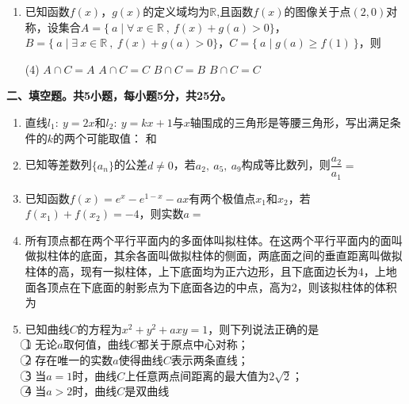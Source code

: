 \documentclass[11pt,a4paper]{ctexart}
\newcommand{\sectiontitle}[1]{
  \par\noindent\textbf{#1}\par%
  }
\begin{document}
\begin{enumerate}
    \item 已知函数$f(x)$，$g(x)$的定义域均为$\mathbb{R}$,且函数$f(x)$的图像关于点$(2,0)$对称，设集合$A=\{\ a \mid \forall \ x\in \mathbb{R} \ ,\ f(x)+g(a)>0\}$，$B=\{\ a \mid \exists \ x\in \mathbb{R} \ ,\ f(x)+g(a)>0\}$，$C=\{\ a \mid g(a) \ge f(1)\ \}$，则
    \begin{tasks}(4)
        \task $A \cap C=A$ 
        \task $A \cap C=C$
        \task $B \cap C=B$
        \task $B \cap C=C$
    \end{tasks}
\end{enumerate}

\newpage
\sectiontitle{二、填空题。共5小题，每小题5分，共25分。}
\begin{enumerate}[start=11] %

    \item 直线$l_1:\ y=2x$和$l_2:\ y=kx+1$与$x$轴围成的三角形是等腰三角形，写出满足条件的$k$的两个可能取值：
    \underline{\hspace{2cm}}和\underline{\hspace{2cm}}

    \item 已知等差数列$\{a_n\}$的公差$d \neq 0$，若$a_2,\ a_5,\ a_9$构成等比数列，则$\dfrac{a_2}{a_1}=$ 
    \underline{\hspace{2cm}}

    \item 已知函数$f(x)=e^x-e^{1-x}-ax$有两个极值点$x_1$和$x_2$，若$f(x_1)+f(x_2)=-4$，则实数$a=$
    \underline{\hspace{2cm}}

    \item 所有顶点都在两个平行平面内的多面体叫拟柱体。在这两个平行平面内的面叫做拟柱体的底面，其余各面叫做拟柱体的侧面，两底面之间的垂直距离叫做拟柱体的高，现有一拟柱体，上下底面均为正六边形，且下底面边长为$4$，上地面各顶点在下底面的射影点为下底面各边的中点，高为$2$，则该拟柱体的体积为
    \underline{\hspace{2cm}}
    
    \item 已知曲线$C$的方程为$x^2+y^2+axy=1$，则下列说法正确的是\underline{\hspace{2cm}}\\[1em]
    \textcircled{1}  无论$a$取何值，曲线$C$都关于原点中心对称；\\
    \textcircled {2} 存在唯一的实数$a$使得曲线$C$表示两条直线；\\
    \textcircled {3} 当$a=1$时，曲线$C$上任意两点间距离的最大值为$2\sqrt{2}$；\\
    \textcircled {4} 当$a>2$时，曲线$C$是双曲线
    
\end{enumerate}
\end{document}
